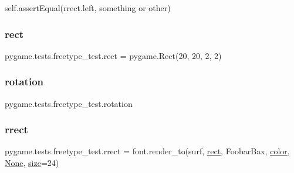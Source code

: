 self.\+assert\+Equal(rrect.\+left, something or other) 

\mbox{\label{namespacepygame_1_1tests_1_1freetype__test_a7cf869ed6b201be698451f25a0d531ea}} 
\subsubsection{\texorpdfstring{rect}{rect}}
{\footnotesize\ttfamily pygame.\+tests.\+freetype\+\_\+test.\+rect = pygame.\+Rect(20, 20, 2, 2)}

\mbox{\label{namespacepygame_1_1tests_1_1freetype__test_ae6c39a84ea6a41b46c2e65dfdcd7cb18}} 
\subsubsection{\texorpdfstring{rotation}{rotation}}
{\footnotesize\ttfamily pygame.\+tests.\+freetype\+\_\+test.\+rotation}

\mbox{\label{namespacepygame_1_1tests_1_1freetype__test_ae83b94cb03337d70226226d54e04003b}} 
\subsubsection{\texorpdfstring{rrect}{rrect}}
{\footnotesize\ttfamily pygame.\+tests.\+freetype\+\_\+test.\+rrect = font.\+render\+\_\+to(surf, \hyperlink{namespacepygame_1_1tests_1_1freetype__test_a7cf869ed6b201be698451f25a0d531ea}{rect}, \textquotesingle{}Foobar\+Bax\textquotesingle{}, \hyperlink{namespacepygame_1_1tests_1_1freetype__test_a8976f7e998008c43d993d3a99f1873ea}{color}, \hyperlink{namespacepygame_1_1tests_1_1freetype__test_a68ff732e0bcda8dbe10438d0b43cdcd2}{None}, \hyperlink{namespacepygame_1_1tests_1_1freetype__test_ad75d5e6258fdce7db138e01e9d36d7e3}{size}=24)}



